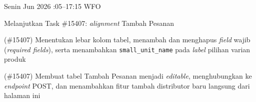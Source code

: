 \begin{logtable}
    {
        Senin  Jun 2026 :05--17:15 \linebreak %
        WFO
    }{
        \begin{loglist}
            \item Melanjutkan Task \#15407: \textit{alignment} Tambah Pesanan
        \end{loglist}
    }{
        \begin{logwork}
            \item (\#15407) Menentukan lebar kolom tabel, menambah dan menghapus \textit{field} wajib (\textit{required fields}), serta menambahkan \texttt{small\_unit\_name} pada \textit{label} pilihan varian produk
            \item (\#15407) Membuat tabel Tambah Pesanan menjadi \textit{editable}, menghubungkan ke \textit{endpoint} POST, dan menambahkan fitur tambah distributor baru langsung dari halaman ini
        \end{logwork}
    }


\end{logtable}

